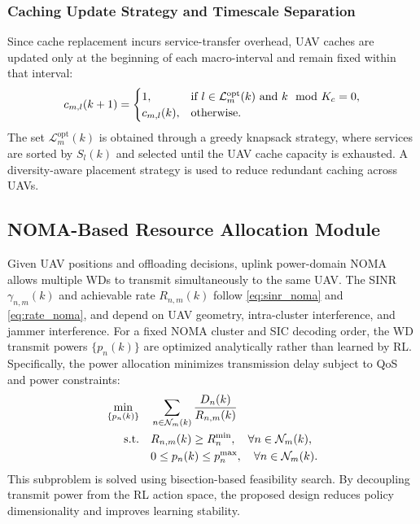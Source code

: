 \documentclass[journal]{IEEEtran}
\begin{document}
\subsubsection{Caching Update Strategy and Timescale Separation}

Since cache replacement incurs service-transfer overhead, UAV caches are updated only at the beginning of each macro-interval and remain fixed within that interval:
\begin{equation}
\small
c_{m,l}(k+1) =
\begin{cases}
1, & \text{if } l \in \mathcal{L}_m^{\mathrm{opt}}(k) \text{ and } k \mod K_c = 0, \\
c_{m,l}(k), & \text{otherwise}.
\end{cases}
\end{equation}
The set $\mathcal{L}_m^{\mathrm{opt}}(k)$ is obtained through a greedy knapsack strategy, where services are sorted by $S_l(k)$ and selected until the UAV cache capacity is exhausted. A diversity-aware placement strategy is used to reduce redundant caching across UAVs.

\subsection{NOMA-Based Resource Allocation Module}

Given UAV positions and offloading decisions, uplink power-domain NOMA allows multiple WDs to transmit simultaneously to the same UAV. The SINR $\gamma_{n,m}(k)$ and achievable rate $R_{n,m}(k)$ follow \eqref{eq:sinr_noma} and \eqref{eq:rate_noma}, and depend on UAV geometry, intra-cluster interference, and jammer interference. For a fixed NOMA cluster and SIC decoding order, the WD transmit powers $\{p_n(k)\}$ are optimized analytically rather than learned by RL. Specifically, the power allocation minimizes transmission delay subject to QoS and power constraints:
\begin{equation}
\small
\begin{aligned}
\min_{\{p_n(k)\}} \quad
& \sum_{n\in\mathcal{N}_m(k)} \frac{D_n(k)}{R_{n,m}(k)}\\
\text{s.t.}\quad
& R_{n,m}(k)\ge R_n^{\min},\quad \forall n\in\mathcal{N}_m(k),\\
& 0\le p_n(k)\le p_n^{\max},\quad \forall n\in\mathcal{N}_m(k).
\end{aligned}
\label{eq:noma_power_problem}
\end{equation}
This subproblem is solved using bisection-based feasibility search. By decoupling transmit power from the RL action space, the proposed design reduces policy dimensionality and improves learning stability.
\end{document}
